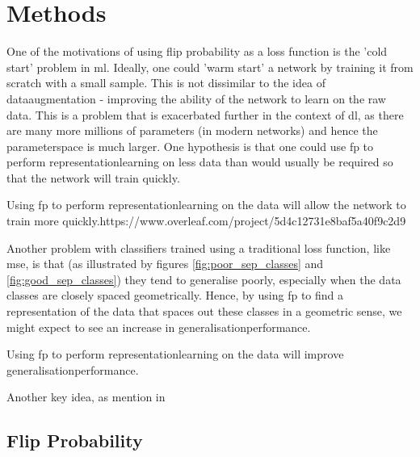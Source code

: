 \chapter{Methods}

One of the motivations of using flip probability as a loss function is the 'cold start' problem in \gls{ml}. Ideally, one could 'warm start' a network by training it from scratch with a small sample. This is not dissimilar to the idea of \gls{dataaugmentation} - improving the ability of the network to learn on the raw data. This is a problem that is exacerbated further in the context of \gls{dl}, as there are many more millions of parameters (in modern networks) and hence the \gls{parameterspace} is much larger. One hypothesis is that one could use \gls{fp} to perform \gls{representationlearning} on less data than would usually be required so that the network will train quickly.

\begin{hypothesis} %
Using \gls{fp} to perform \gls{representationlearning} on the data will allow the network to train more quickly.https://www.overleaf.com/project/5d4c12731e8baf5a40f9c2d9
\label{hyp:first}
\end{hypothesis}

Another problem with classifiers trained using a traditional loss function, like \gls{mse}, is that (as illustrated by figures \ref{fig:poor_sep_classes} and \ref{fig:good_sep_classes}) they tend to generalise poorly, especially when the data classes are closely spaced geometrically. Hence, by using \gls{fp} to find a representation of the data that spaces out these classes in a geometric sense, we might expect to see an increase in \gls{generalisationperformance}.

\begin{hypothesis} %
Using \gls{fp} to perform \gls{representationlearning} on the data will improve \gls{generalisationperformance}.
\label{hyp:second}
\end{hypothesis}

Another key idea, as mention in 

\section{Flip Probability}


